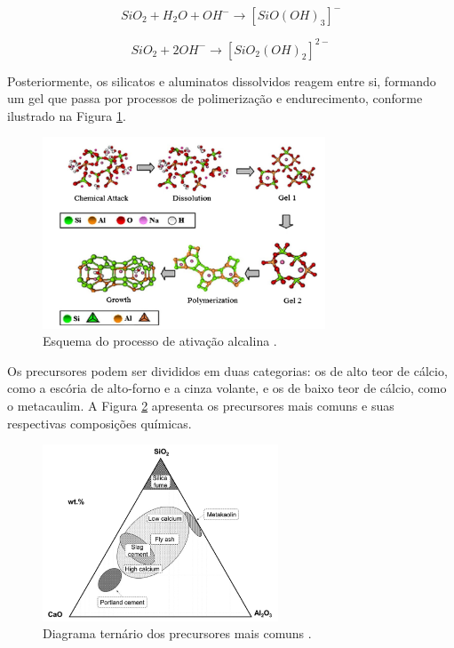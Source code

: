 \begin{equation}
  SiO_2 + H_2O + OH^- \rightarrow \left[SiO(OH)_3\right]^- 
\end{equation}

\begin{equation}
  SiO_2 + 2OH^- \rightarrow \left[SiO_2(OH)_2\right]^{2-}
\end{equation}

Posteriormente, os silicatos e aluminatos dissolvidos reagem entre si, formando um gel que passa por processos de polimerização e endurecimento, conforme ilustrado na Figura \ref{fig:ativacao}.

\begin{figure}[ht]
  \centering
  \includegraphics[width=0.75\textwidth]{Cap2/ativacao.png}
  \caption{Esquema do processo de ativação alcalina \cite{duxson2006geopolymer}.}
  \label{fig:ativacao}
\end{figure}

Os precursores podem ser divididos em duas categorias: os de alto teor de cálcio, como a escória de alto-forno e a cinza volante, e os de baixo teor de cálcio, como o metacaulim.
A Figura \ref{fig:diagrama_ternario} apresenta os precursores mais comuns e suas respectivas composições químicas.

\begin{figure}[ht]
  \centering
  \includegraphics[width=0.625\textwidth]{Cap2/diagrama_ternario.png}
  \caption{Diagrama ternário dos precursores mais comuns \cite{giergiczny2019fly}.}
  \label{fig:diagrama_ternario}
\end{figure}

